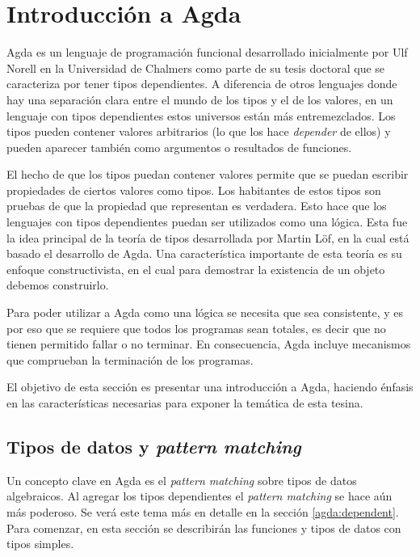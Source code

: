 \chapter{Introducci\'on a Agda} \label{chapter:agda}

Agda es un lenguaje de programación funcional desarrollado inicialmente por Ulf Norell en la Universidad de Chalmers como parte de su tesis doctoral \cite{norell:thesis} que se caracteriza por tener tipos dependientes. A diferencia de otros lenguajes donde hay una separación clara entre el mundo de los tipos y el de los valores, en un lenguaje con tipos dependientes estos universos están más entremezclados. Los tipos pueden contener valores arbitrarios (lo que los hace \textit{depender} de ellos) y pueden aparecer también como argumentos o resultados de funciones.

El hecho de que los tipos puedan contener valores permite que se puedan escribir propiedades de ciertos valores como tipos. Los habitantes de estos tipos son pruebas de que la propiedad que representan es verdadera. Esto hace que los lenguajes con tipos dependientes puedan ser utilizados como una lógica. Esta fue la idea principal de la teoría de tipos desarrollada por Martin Löf, en la cual está basado el desarrollo de Agda. Una característica importante de esta teoría es su enfoque constructivista, en el cual para demostrar la existencia de un objeto debemos construirlo.

Para poder utilizar a Agda como una lógica se necesita que sea consistente, y es por eso que se requiere que todos los programas sean totales, es decir que no tienen permitido fallar o no terminar. En consecuencia, Agda incluye mecanismos que comprueban la terminación de los programas.

El objetivo de esta sección es presentar una introducción a Agda, haciendo énfasis en las características necesarias para exponer la temática de esta tesina. 

\section{Tipos de datos y \textit{pattern matching}}\label{agda:tipos}

Un concepto clave en Agda es el \textit{pattern matching} sobre tipos de datos algebraicos. Al agregar los tipos dependientes el \textit{pattern matching} se hace aún más poderoso. Se verá este tema más en detalle en la sección \ref{agda:dependent}. Para comenzar, en esta sección se describirán las funciones y tipos de datos con tipos simples. 

